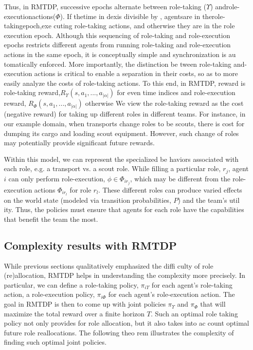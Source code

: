 \documentclass{IEEEtran}
\begin{document}
Thus, in RMTDP, successive epochs alternate between
 role-taking ($\Upsilon$) androle-executionactions($\Phi$). If thetime in
dexis divisible by , agentsare in therole-takingepoch,exe
cuting role-taking actions, and otherwise they are in the role
execution epoch. Although this sequencing of role-taking
 and role-execution epochs restricts different agents from
 running role-taking and role-execution actions in the same
 epoch, it is conceptually simple and synchronization is au
tomatically enforced. More importantly, the distinction be
tween role-taking and-execution actions is critical to enable
 a separation in their costs, so as to more easily analyze the
 costs of role-taking actions. To this end, in RMTDP, reward
 is role-taking reward,$R_\Upsilon(s,a_1,...,a_{|\alpha|})$ for even time indices and role-execution reward, $R_\Phi(s,a_1,...,a_{|\alpha|})$ otherwise We view the role-taking reward as the cost (negative
 reward) for taking up different roles in different teams. For
 instance, in our example domain, when transports change
 roles to be scouts, there is cost for dumping its cargo and
 loading scout equipment. However, such change of roles
 may potentially provide significant future rewards.

 Within this model, we can represent the specialized be
haviors associated with each role, e.g. a transport vs. a scout role. While filling a particular role, $r_j$, agent $i$ can only perform role-execution, $\phi\in\Phi_{ir_j}$, which may be different from the role-execution actions $\Phi_{ir_l}$ for role $r_l$. These
 different roles can produce varied effects on the world state
 (modeled via transition probabilities, $P$) and the team's util
ity. Thus, the policies must ensure that agents for each role
 have the capabilities that benefit the team the most.

\subsection{\textbf{ Complexity results with RMTDP}}
While previous sections qualitatively emphasized the diffi
culty of role (re)allocation, RMTDP helps in understanding
 the complexity more precisely. In particular, we can define
 a role-taking policy, $\pi_{i\Upsilon}$ for each agent's role-taking action, a role-execution policy, $\pi_{i\Phi}$  for each agent's role-execution
 action. The goal in RMTDP is then to come up with joint
 policies $\pi_\Upsilon$ and $\pi_\Phi$ that will maximize the total reward over
 a finite horizon $T$. Such an optimal role taking policy not
 only provides for role allocation, but it also takes into ac
count optimal future role reallocations. The following theo
rem illustrates the complexity of finding such optimal joint
 policies.
\end{document}
